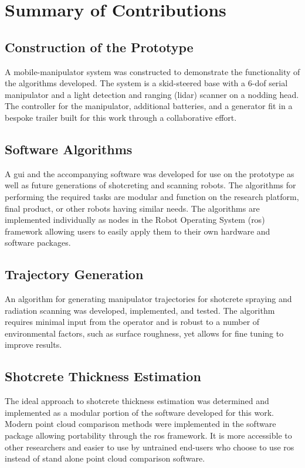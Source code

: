 \section{Summary of Contributions}
\label{sec:contributions}

\subsection{Construction of the Prototype}
A mobile-manipulator system was constructed to demonstrate the functionality of the algorithms developed. The system is a skid-steered base with a 6-\acrshort{dof} serial manipulator and a light detection and ranging (\acrshort{lidar}) scanner on a nodding head. The controller for the manipulator, additional batteries, and a generator fit in a bespoke trailer built for this work through a collaborative effort.\\

\subsection{Software Algorithms}
A \acrshort{gui} and the accompanying software was developed for use on the prototype as well as future generations of shotcreting and scanning robots. The algorithms for performing the required tasks are modular and  function on the research platform, final product, or other robots having similar needs. The algorithms are implemented individually as nodes in the Robot Operating System (\acrshort{ros}) framework allowing users to easily apply them to their own hardware and software packages.\\

\subsection{Trajectory Generation}
An algorithm for generating manipulator trajectories for shotcrete spraying and radiation scanning was developed, implemented, and tested. The algorithm requires minimal input from the operator and is robust to a number of environmental factors, such as surface roughness, yet allows for fine tuning to improve results.\\

\subsection{Shotcrete Thickness Estimation}
The ideal approach to shotcrete thickness estimation was determined and implemented as a modular portion of the software developed for this work. Modern point cloud comparison methods were implemented in the software package allowing portability through the \acrshort{ros} framework. It is more accessible to other researchers and easier to use by untrained end-users who choose to use \acrshort{ros} instead of stand alone point cloud comparison software.

